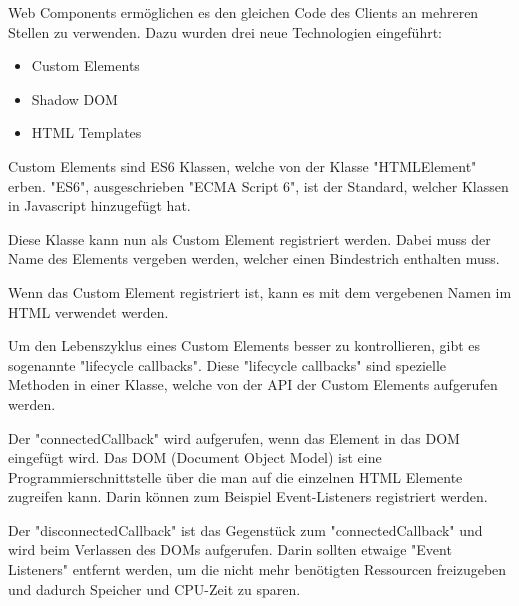 
Web Components ermöglichen es den gleichen Code des Clients an mehreren Stellen zu verwenden. Dazu wurden drei neue Technologien \cite{MDNWebComponents} eingeführt:

\begin{itemize}
    \item Custom Elements
    \item Shadow DOM
    \item HTML Templates
\end{itemize}




Custom Elements sind ES6 Klassen, welche von der Klasse "HTMLElement" erben. "ES6", ausgeschrieben "ECMA Script 6", ist der Standard, welcher Klassen in Javascript hinzugefügt hat.\cite{MDNes6Classes}


Diese Klasse kann nun als Custom Element registriert werden. Dabei muss der Name des Elements vergeben werden, welcher einen Bindestrich enthalten muss.


Wenn das Custom Element registriert ist, kann es mit dem vergebenen Namen im HTML verwendet werden.



Um den Lebenszyklus eines Custom Elements besser zu kontrollieren, gibt es sogenannte "lifecycle callbacks". Diese "lifecycle callbacks" sind spezielle Methoden in einer Klasse, welche von der API der Custom Elements aufgerufen werden.

Der "connectedCallback" wird aufgerufen, wenn das Element in das DOM eingefügt wird. Das DOM (Document Object Model) ist eine Programmierschnittstelle über die man auf die einzelnen HTML Elemente zugreifen kann. \cite{MDNDOM} Darin können zum Beispiel Event-Listeners registriert werden.

   
Der "disconnectedCallback" ist das Gegenstück zum "connectedCallback" und wird beim Verlassen des DOMs aufgerufen. Darin sollten etwaige "Event Listeners" entfernt werden, um die nicht mehr benötigten Ressourcen freizugeben und dadurch Speicher und CPU-Zeit zu sparen.  

